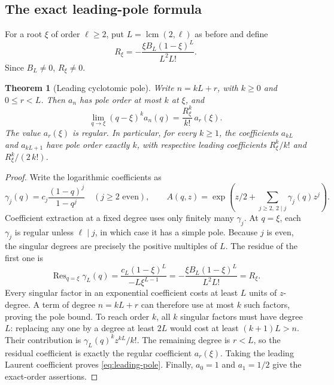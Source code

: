 \documentclass[11pt,a4paper]{article}
\numberwithin{equation}{section}
\newtheorem{theorem}{Theorem}[section]
\theoremstyle{definition}
\theoremstyle{remark}
\newcommand{\lcm}{\operatorname{lcm}}
\newcommand{\Res}{\operatorname{Res}}
\begin{document}
\subsection{The exact leading-pole formula}
For a root \(\xi\) of order \(\ell\ge2\), put \(L=\lcm(2,\ell)\) as before and define
\begin{equation}\label{eq:Rxi}
 R_\xi=-\frac{\xi B_L(1-\xi)^L}{L^2L!}.
\end{equation}
Since \(B_L\ne0\), \(R_\xi\ne0\).

\begin{theorem}[Leading cyclotomic pole]\label{thm:moment-pole}
Write \(n=kL+r\), with \(k\ge0\) and \(0\le r<L\). Then \(a_n\) has pole order at most \(k\) at \(\xi\), and
\begin{equation}\label{eq:leading-pole}
 \lim_{q\to\xi}(q-\xi)^k a_n(q)
 =\frac{R_\xi^k}{k!}\,a_r(\xi).
\end{equation}
The value \(a_r(\xi)\) is regular. In particular, for every \(k\ge1\), the coefficients \(a_{kL}\) and \(a_{kL+1}\) have pole order exactly \(k\), with respective leading coefficients \(R_\xi^k/k!\) and \(R_\xi^k/(2\,k!)\).
\end{theorem}
\begin{proof}
Write the logarithmic coefficients as
\[
 \gamma_j(q)=c_j\frac{(1-q)^j}{1-q^j}\quad(j\ge2\text{ even}),
 \qquad
 A(q,z)=\exp\left(z/2+\sum_{j\ge2,\ 2\mid j}\gamma_j(q)z^j\right).
\]
Coefficient extraction at a fixed degree uses only finitely many \(\gamma_j\). At \(q=\xi\), each \(\gamma_j\) is regular unless \(\ell\mid j\), in which case it has a simple pole. Because \(j\) is even, the singular degrees are precisely the positive multiples of \(L\). The residue of the first one is
\[
 \Res_{q=\xi}\gamma_L(q)
 =\frac{c_L(1-\xi)^L}{-L\xi^{L-1}}
 =-\frac{\xi B_L(1-\xi)^L}{L^2L!}=R_\xi.
\]
Every singular factor in an exponential coefficient costs at least \(L\) units of \(z\)-degree. A term of degree \(n=kL+r\) can therefore use at most \(k\) such factors, proving the pole bound. To reach order \(k\), all \(k\) singular factors must have degree \(L\): replacing any one by a degree at least \(2L\) would cost at least \((k+1)L>n\). Their contribution is \(\gamma_L(q)^kz^{kL}/k!\). The remaining degree is \(r<L\), so the residual coefficient is exactly the regular coefficient \(a_r(\xi)\). Taking the leading Laurent coefficient proves \eqref{eq:leading-pole}. Finally, \(a_0=1\) and \(a_1=1/2\) give the exact-order assertions.
\end{proof}
\end{document}
